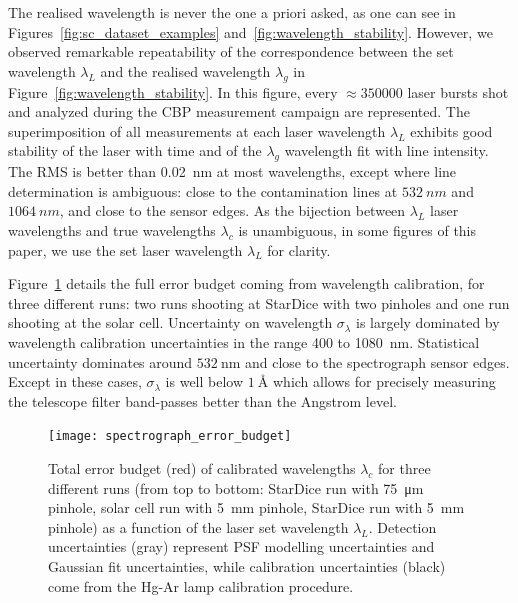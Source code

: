 The realised wavelength is never the one a priori asked, as one can see in Figures~\ref{fig:sc_dataset_examples} and~\ref{fig:wavelength_stability}. However, we observed remarkable repeatability of the correspondence between the set wavelength $\lambda_L$ and the realised wavelength $\lambda_g$ in Figure~\ref{fig:wavelength_stability}. In this figure, every $\approx\num{350000}$ laser bursts shot and analyzed during the CBP measurement campaign are represented. The superimposition of all measurements at each laser wavelength $\lambda_L$ exhibits good stability of the laser with time and of the $\lambda_g$ wavelength fit with line intensity. The RMS is better than \SI{0.02}{\nm} at most wavelengths, except where line determination is ambiguous: close to the contamination lines at $\SI{532}{nm}$ and $\SI{1064}{nm}$, and close to the sensor edges. As the bijection between $\lambda_L$ laser wavelengths and true wavelengths $\lambda_c$ is unambiguous, in some figures of this paper, we use the set laser wavelength $\lambda_L$ for clarity. 

Figure~\ref{fig:wavelength_error_budget} details the full error budget coming from wavelength calibration, for three different runs: two runs shooting at StarDice with two pinholes and one run shooting at the solar cell. Uncertainty on wavelength $\sigma_\lambda$ is largely dominated by wavelength calibration uncertainties in the range 400 to \SI{1080}{\nm}. Statistical uncertainty dominates around $\SI{532}{\nm}$ and close to the spectrograph sensor edges. Except in these cases, $\sigma_\lambda$ is well below $\SI{1}{\angstrom}$ which allows for precisely measuring the telescope filter band-passes better than the Angstrom level.   


\begin{figure}[!h]
\centering
\texttt{[image: spectrograph\_error\_budget]}
\caption{Total error budget (red) of calibrated wavelengths $\lambda_c$ for three different runs (from top to bottom: StarDice run with \SI{75}{\um} pinhole, solar cell run with \SI{5}{mm} pinhole, StarDice run with \SI{5}{mm} pinhole) as a function of the laser set wavelength $\lambda_L$. Detection uncertainties (gray) represent PSF modelling uncertainties and Gaussian fit uncertainties, while calibration uncertainties (black) come from the Hg-Ar lamp calibration procedure. }\label{fig:wavelength_error_budget}
\end{figure}


